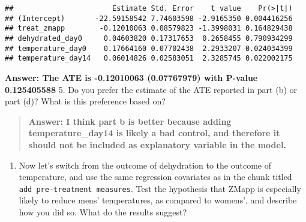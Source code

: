 \documentclass[
]{article}
\newenvironment{Shaded}{\begin{snugshade}}{\end{snugshade}}
\newcommand{\DataTypeTok}[1]{\textcolor[rgb]{0.13,0.29,0.53}{#1}}
\newcommand{\DecValTok}[1]{\textcolor[rgb]{0.00,0.00,0.81}{#1}}
\newcommand{\KeywordTok}[1]{\textcolor[rgb]{0.13,0.29,0.53}{\textbf{#1}}}
\newcommand{\NormalTok}[1]{#1}
\newcommand{\OperatorTok}[1]{\textcolor[rgb]{0.81,0.36,0.00}{\textbf{#1}}}
\newcommand{\OtherTok}[1]{\textcolor[rgb]{0.56,0.35,0.01}{#1}}
\newcommand{\StringTok}[1]{\textcolor[rgb]{0.31,0.60,0.02}{#1}}
\providecommand{\tightlist}{%
  \setlength{\itemsep}{0pt}\setlength{\parskip}{0pt}}
\begin{document}
\begin{verbatim}
##                       Estimate Std. Error    t value    Pr(>|t|)
## (Intercept)       -22.59158542 7.74603598 -2.9165350 0.004416256
## treat_zmapp        -0.12010063 0.08579823 -1.3998031 0.164829438
## dehydrated_day0     0.04603820 0.17317653  0.2658455 0.790934299
## temperature_day0    0.17664160 0.07702438  2.2933207 0.024034399
## temperature_day14   0.06014826 0.02583051  2.3285745 0.022002175
\end{verbatim}

\textbf{Answer: The ATE is -0.12010063 (0.07767979) with P-value
0.125405588} 5. Do you prefer the estimate of the ATE reported in part
(b) or part (d)? What is this preference based on?

\begin{quote}
\textbf{Answer: I think part b is better because adding
temperature\_day14 is likely a bad control, and therefore it should not
be included as explanatory variable in the model.}
\end{quote}

\begin{enumerate}
\def\labelenumi{\arabic{enumi}.}
\setcounter{enumi}{5}
\tightlist
\item
  Now let's switch from the outcome of dehydration to the outcome of
  temperature, and use the same regression covariates as in the chunk
  titled \texttt{add\ pre-treatment\ measures}. Test the hypothesis that
  ZMapp is especially likely to reduce mens' temperatures, as compared
  to womens', and describe how you did so. What do the results suggest?
\end{enumerate}

\begin{Shaded}
\end{Shaded}
\end{document}

